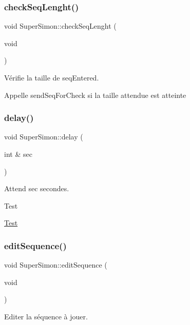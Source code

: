 \subsubsection{\texorpdfstring{check\+Seq\+Lenght()}{checkSeqLenght()}}
{\footnotesize\ttfamily void Super\+Simon\+::check\+Seq\+Lenght (\begin{DoxyParamCaption}\item[{void}]{ }\end{DoxyParamCaption})}



Vérifie la taille de seq\+Entered. 

Appelle send\+Seq\+For\+Check si la taille attendue est atteinte \mbox{\label{class_super_simon_af12663f8a26a971a508a40a33d0afceb}} 
\subsubsection{\texorpdfstring{delay()}{delay()}}
{\footnotesize\ttfamily void Super\+Simon\+::delay (\begin{DoxyParamCaption}\item[{int \&}]{sec }\end{DoxyParamCaption})}



Attend sec secondes. 

\begin{DoxyRefDesc}{Test}
\item[\hyperlink{test__test000006}{Test}]\end{DoxyRefDesc}
\mbox{\label{class_super_simon_af00408823847e80a511019baa536afb3}} 
\subsubsection{\texorpdfstring{edit\+Sequence()}{editSequence()}}
{\footnotesize\ttfamily void Super\+Simon\+::edit\+Sequence (\begin{DoxyParamCaption}\item[{void}]{ }\end{DoxyParamCaption})}



Editer la séquence à jouer. 

